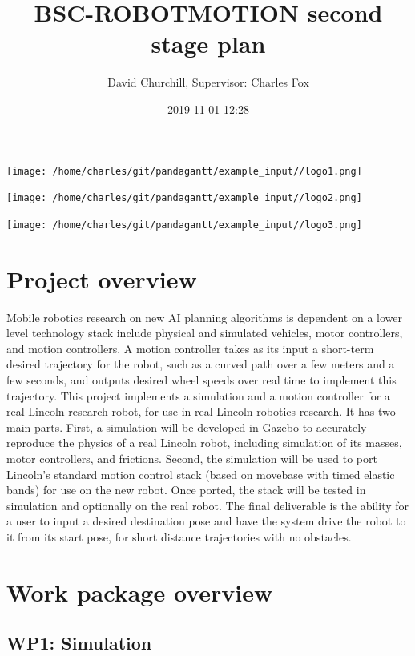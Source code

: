 \documentclass[english]{article}
\begin{document}
\title{BSC-ROBOTMOTION second stage plan}\author{David Churchill, Supervisor: Charles Fox}\date{2019-11-01 12:28}\maketitle
\begin{center}

\texttt{[image: /home/charles/git/pandagantt/example\_input//logo1.png]}

\texttt{[image: /home/charles/git/pandagantt/example\_input//logo2.png]}

\texttt{[image: /home/charles/git/pandagantt/example\_input//logo3.png]}

\end{center}

\newpage

\section{Project overview}

Mobile robotics research on new AI planning algorithms is dependent on a lower level technology stack include physical and simulated vehicles, motor controllers, and motion controllers. A motion controller takes as its input a short-term desired trajectory for the robot, such as a curved path over a few meters and a few seconds, and outputs desired wheel speeds over real time to implement this trajectory. This project implements a simulation and a motion controller for a real Lincoln research robot, for use in real Lincoln robotics research. It has two main parts. First, a simulation will be developed in Gazebo to accurately reproduce the physics of a real Lincoln robot, including simulation of its masses, motor controllers, and frictions. Second, the simulation will be used to port Lincoln’s standard motion control stack (based on movebase with timed elastic bands) for use on the new robot. Once ported, the stack will be tested in simulation and optionally on the real robot. The final deliverable is the ability for a user to input a desired destination pose and have the system drive the robot to it from its start pose, for short distance trajectories with no obstacles.\newpage

\section{Work package overview}

\subsection*{WP1: Simulation}
\end{document}
